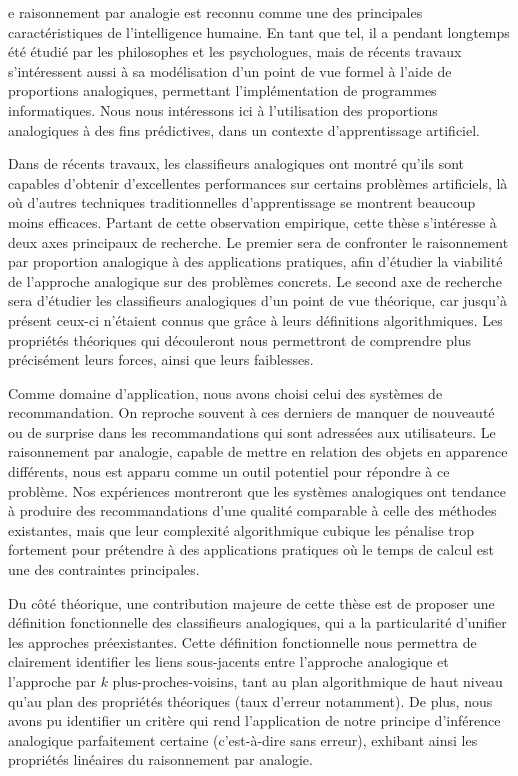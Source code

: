 e raisonnement par analogie est reconnu comme une des principales
caractéristiques de l'intelligence humaine. En tant que tel, il a pendant
longtemps été étudié par les philosophes et les psychologues, mais de récents
travaux s'intéressent aussi à sa modélisation d'un point de vue formel à l'aide
de proportions analogiques, permettant l'implémentation de programmes
informatiques. Nous nous intéressons ici à l'utilisation des proportions
analogiques à des fins prédictives, dans un contexte d'apprentissage
artificiel.

Dans de récents travaux, les classifieurs analogiques ont montré qu'ils sont
capables d'obtenir d'excellentes performances sur certains problèmes
artificiels, là où d'autres techniques traditionnelles d'apprentissage se
montrent beaucoup moins efficaces. Partant de cette observation empirique,
cette thèse s'intéresse à deux axes principaux de recherche.  Le premier sera
de confronter le raisonnement par proportion analogique à des applications
pratiques, afin d'étudier la viabilité de l'approche analogique sur des
problèmes concrets.  Le second axe de recherche sera d'étudier les classifieurs
analogiques d'un point de vue théorique, car jusqu'à présent ceux-ci n'étaient
connus que grâce à leurs définitions algorithmiques. Les propriétés théoriques
qui découleront nous permettront de comprendre plus précisément leurs forces,
ainsi que leurs faiblesses.

Comme domaine d'application, nous avons choisi celui des systèmes de
recommandation. On reproche souvent à ces derniers de manquer de nouveauté ou
de surprise dans les recommandations qui sont adressées aux utilisateurs. Le
raisonnement par analogie, capable de mettre en relation des objets en
apparence différents, nous est apparu comme un outil potentiel pour répondre à
ce problème. Nos expériences montreront que les systèmes analogiques ont
tendance à produire des recommandations d'une qualité comparable à celle des
méthodes existantes, mais que leur complexité algorithmique cubique les
pénalise trop fortement pour prétendre à des applications pratiques où le temps
de calcul est une des contraintes principales.

Du côté théorique, une contribution majeure de cette thèse est de proposer une
définition fonctionnelle des classifieurs analogiques, qui a la particularité
d'unifier les approches préexistantes. Cette définition fonctionnelle nous
permettra de clairement identifier les liens sous-jacents entre l'approche
analogique et l'approche par $k$ plus-proches-voisins, tant au plan
algorithmique de haut niveau qu'au plan des propriétés théoriques (taux
d'erreur notamment). De plus, nous avons pu identifier un critère
qui rend l'application de notre principe d'inférence analogique parfaitement
certaine (c'est-à-dire sans erreur), exhibant ainsi les propriétés linéaires
du raisonnement par analogie.
